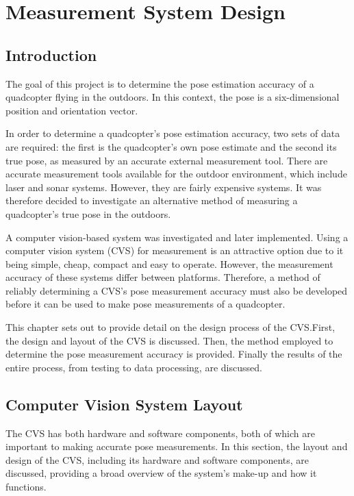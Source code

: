 \chapter{Measurement System Design}
\label{chap3}

\section{Introduction}

The goal of this project is to determine the pose estimation accuracy of a quadcopter flying in the outdoors. In this context, the pose is a six-dimensional position and orientation vector.

In order to determine a quadcopter's pose estimation accuracy, two sets of data are required: the first is the quadcopter's own pose estimate and the second its true pose, as measured by an accurate external measurement tool. There are accurate measurement tools available for the outdoor environment, which include laser and sonar systems. However, they are fairly expensive systems. It was therefore decided to investigate an alternative method of measuring a quadcopter's true pose in the outdoors.

A computer vision-based system was investigated and later implemented. Using a computer vision system (CVS) for measurement is an attractive option due to it being simple, cheap, compact and easy to operate. However, the measurement accuracy of these systems differ between platforms. Therefore, a method of reliably determining a CVS's pose measurement accuracy must also be developed before it can be used to make pose measurements of a quadcopter. 

This chapter sets out to provide detail on the design process of the CVS.\@ First, the design and layout of the CVS is discussed. Then, the method employed to determine the pose measurement accuracy is provided. Finally the results of the entire process, from testing to data processing, are discussed.

\section{Computer Vision System Layout}
\label{sec:chap3-cvs-layout}

The CVS has both hardware and software components, both of which are important to making accurate pose measurements. In this section, the layout and design of the CVS, including its hardware and software components, are discussed, providing a broad overview of the system's make-up and how it functions. 

